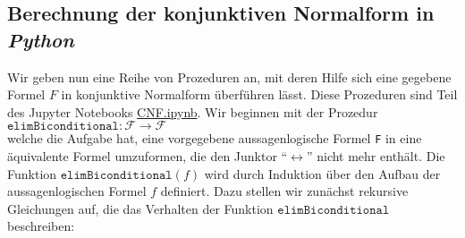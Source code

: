 \subsection{Berechnung der konjunktiven Normalform in \textsl{Python}}
Wir geben nun eine Reihe von Prozeduren an, mit deren Hilfe sich eine gegebene
Formel $F$ in konjunktive Normalform überführen lässt.  Diese Prozeduren sind Teil des Jupyter Notebooks
\href{https://github.com/karlstroetmann/Logik/blob/master/Python/CNF.ipynb}{CNF.ipynb}.
Wir beginnen mit der
Prozedur 
\\[0.2cm]
\hspace*{1.3cm}
$\texttt{elimBiconditional}: \mathcal{F} \rightarrow \mathcal{F}$
\\[0.2cm]
welche die Aufgabe hat, eine vorgegebene aussagenlogische Formel \texttt{F} in eine äquivalente Formel
umzuformen, die den Junktor ``$\leftrightarrow$'' nicht mehr enthält.  Die Funktion
$\texttt{elimBiconditional}(f)$ wird durch Induktion über den Aufbau der aussagenlogischen Formel $f$ definiert.
Dazu stellen wir zunächst rekursive Gleichungen auf,
die das Verhalten der Funktion $\texttt{elimBiconditional}$ beschreiben:
